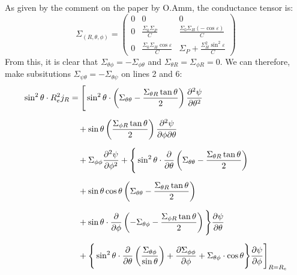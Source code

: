 \documentclass{article}
\begin{document}
As given by the comment on the paper by O.Amm, the conductance tensor is:
\begin{equation*}
	\Sigma_{(R, \theta,\phi)} = \left(\begin{matrix}
			0 & 0                                         & 0                                                \\
			0 & \frac{\Sigma_0\Sigma_P}{C}                & \frac{\Sigma_0\Sigma_H(-\cos\varepsilon)}{C}     \\
			0 & \frac{\Sigma_0\Sigma_H\cos\varepsilon}{C} & \Sigma_P + \frac{\Sigma_H^2\sin^2\varepsilon}{C}
		\end{matrix}\right)
\end{equation*}
From this, it is clear that $\Sigma_{\theta\phi} = -\Sigma_{\phi\theta}$ and $\Sigma_{\theta R} = \Sigma_{\phi R} = 0$. We can therefore, make subsitutions $\Sigma_{\psi\theta} = -\Sigma_{\theta\psi}$ on lines 2 and 6:
\begin{equation*}
	\begin{aligned}
		\sin^2\theta \cdot R_e^2j_R
		 & =  \Bigg[
			\sin^2 \theta \cdot \left( \Sigma_{\theta\theta} - \frac{\Sigma_{\theta R} \tan\theta}{2} \right)
		\pdv[2]{\psi}{\theta}                                                         \\[6pt]
		 & \quad + \sin\theta
		\left( \frac{\Sigma_{\phi R} \tan\theta}{2} \right)
		\pdv{\psi}{\phi}{\theta}                                                      \\[6pt]
		 & \quad + \Sigma_{\phi\phi}
		\pdv[2]{\psi}{\phi} + \Bigg\{
		\sin^2\theta\cdot \pdv{\theta}
		\left( \Sigma_{\theta\theta} - \frac{\Sigma_{\theta R} \tan\theta}{2} \right) \\[6pt]
		 & \quad + \sin \theta\cos\theta
		\left( \Sigma_{\theta\theta} - \frac{\Sigma_{\theta R} \tan\theta}{2} \right) \\[6pt]
		 & \quad + \sin\theta\cdot
		\pdv{\phi}
		\left( -\Sigma_{\theta\phi} - \frac{\Sigma_{\phi R} \tan\theta}{2} \right)
		\Bigg\}\pdv{\psi}{\theta}                                                     \\[6pt]
		 & \quad + \Bigg\{\sin^2\theta\cdot\pdv{\theta}
		\left( \frac{\Sigma_{\theta\phi}}{\sin\theta} \right) +
		\pdv{\Sigma_{\phi\phi}}{\phi}
		+ \Sigma_{\theta\phi}\cdot\cos\theta
		\Bigg\}\pdv{\psi}{\phi}
		\Bigg]_{R = R_e}
	\end{aligned}
\end{equation*}
\end{document}
